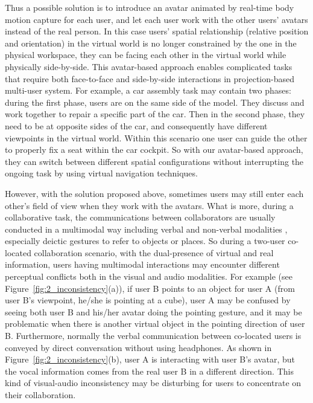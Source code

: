 Thus a possible solution is to introduce an avatar animated by real-time body motion capture for each user, and let each user work with the other users' avatars instead of the real person. In this case users' spatial relationship (relative position and orientation) in the virtual world is no longer constrained by the one in the physical workspace, they can be facing each other in the virtual world while physically side-by-side. This avatar-based approach enables complicated tasks that require both face-to-face and side-by-side interactions in projection-based multi-user system. For example, a car assembly task may contain two phases: during the first phase, users are on the same side of the model. They discuss and work together to repair a specific part of the car. Then in the second phase, they need to be at opposite sides of the car, and consequently have different viewpoints in the virtual world. Within this scenario one user can guide the other to properly fix a seat within the car cockpit. So with our avatar-based approach, they can switch between different spatial configurations without interrupting the ongoing task by using virtual navigation techniques.

However, with the solution proposed above, sometimes users may still enter each other's field of view when they work with the avatars. What is more, during a collaborative task, the communications between collaborators are usually conducted in a multimodal way \citep{Paggio2005Multimodal, Ennis2010Seeing} including verbal and non-verbal modalities \citep{Bailenson2002Gaze, Dodds2011Talk}, especially deictic gestures to refer to objects or places. So during a two-user co-located collaboration scenario, with the dual-presence of virtual and real information, users having multimodal interactions may encounter different perceptual conflicts both in the visual and audio modalities. For example (see Figure~\ref{fig:2_inconsistency}(a)), if user B points to an object for user A (from user B's viewpoint, he/she is pointing at a cube), user A may be confused by seeing both user B and his/her avatar doing the pointing gesture, and it may be problematic when there is another virtual object in the pointing direction of user B. Furthermore, normally the verbal communication between co-located users is conveyed by direct conversation without using headphones. As shown in Figure~\ref{fig:2_inconsistency}(b), user A is interacting with user B's avatar, but the vocal information comes from the real user B in a different direction. This kind of visual-audio inconsistency \citep{Di2009Recalibration, Spence2013Just} may be disturbing for users to concentrate on their collaboration.

